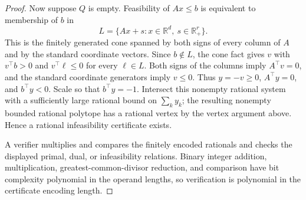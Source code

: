 \documentclass{article}
\begin{document}
\begin{proof}
Now suppose \(Q\) is empty. Feasibility of \(Ax\le b\) is equivalent to membership of \(b\) in
\[L=\{Ax+s:x\in\mathbb R^d,\ s\in\mathbb R_+^r\}.\]
This is the finitely generated cone spanned by both signs of every column of \(A\) and by the standard coordinate vectors. Since \(b\notin L\), the cone fact gives \(v\) with \(v^\top b>0\) and \(v^\top\ell\le0\) for every \(\ell\in L\). Both signs of the columns imply \(A^\top v=0\), and the standard coordinate generators imply \(v\le0\). Thus \(y=-v\ge0\), \(A^\top y=0\), and \(b^\top y<0\). Scale so that \(b^\top y=-1\). Intersect this nonempty rational system with a sufficiently large rational bound on \(\sum_k y_k\); the resulting nonempty bounded rational polytope has a rational vertex by the vertex argument above. Hence a rational infeasibility certificate exists.

A verifier multiplies and compares the finitely encoded rationals and checks the displayed primal, dual, or infeasibility relations. Binary integer addition, multiplication, greatest-common-divisor reduction, and comparison have bit complexity polynomial in the operand lengths, so verification is polynomial in the certificate encoding length.
\end{proof}
\end{document}
